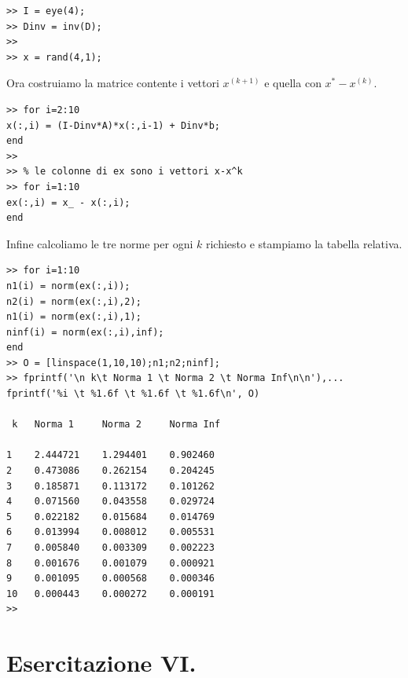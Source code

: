 \begin{enumerate}
\begin{svol}
\begin{codice}
\begin{verbatim}
>> I = eye(4);
>> Dinv = inv(D);
>>
>> x = rand(4,1);
\end{verbatim}
\end{codice}
Ora costruiamo la matrice contente i vettori $x^{(k+1)}$ e quella con
$x^*-x^{(k)}$.
\begin{codice}
\begin{verbatim}
>> for i=2:10
x(:,i) = (I-Dinv*A)*x(:,i-1) + Dinv*b;
end
>>
>> % le colonne di ex sono i vettori x-x^k
>> for i=1:10
ex(:,i) = x_ - x(:,i); 
end
\end{verbatim}
\end{codice}
Infine calcoliamo le tre norme per ogni $k$ richiesto e stampiamo la tabella
relativa.
\begin{codice}
\begin{verbatim}
>> for i=1:10
n1(i) = norm(ex(:,i));
n2(i) = norm(ex(:,i),2);
n1(i) = norm(ex(:,i),1);
ninf(i) = norm(ex(:,i),inf);
end
>> O = [linspace(1,10,10);n1;n2;ninf];
>> fprintf('\n k\t Norma 1 \t Norma 2 \t Norma Inf\n\n'),...
fprintf('%i \t %1.6f \t %1.6f \t %1.6f\n', O)

 k	 Norma 1 	 Norma 2 	 Norma Inf

1 	 2.444721 	 1.294401 	 0.902460
2 	 0.473086 	 0.262154 	 0.204245
3 	 0.185871 	 0.113172 	 0.101262
4 	 0.071560 	 0.043558 	 0.029724
5 	 0.022182 	 0.015684 	 0.014769
6 	 0.013994 	 0.008012 	 0.005531
7 	 0.005840 	 0.003309 	 0.002223
8 	 0.001676 	 0.001079 	 0.000921
9 	 0.001095 	 0.000568 	 0.000346
10 	 0.000443 	 0.000272 	 0.000191
>> 
\end{verbatim}
\end{codice}
\end{svol}

\end{enumerate}


\section{Esercitazione VI.}

